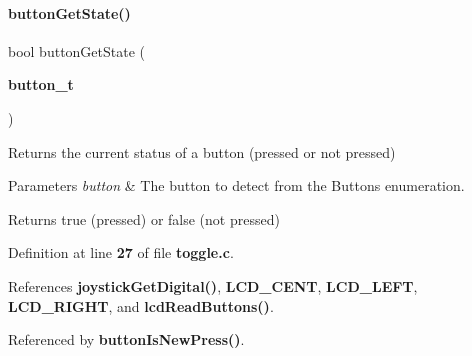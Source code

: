 \paragraph{button\+Get\+State()}
{\footnotesize\ttfamily bool button\+Get\+State (\begin{DoxyParamCaption}\item[{\textbf{ button\+\_\+t}}]{ }\end{DoxyParamCaption})}



Returns the current status of a button (pressed or not pressed) 


\begin{DoxyParams}{Parameters}
{\em button} & The button to detect from the Buttons enumeration.\\
\hline
\end{DoxyParams}
\begin{DoxyReturn}{Returns}
true (pressed) or false (not pressed) 
\end{DoxyReturn}


Definition at line \textbf{ 27} of file \textbf{ toggle.\+c}.



References \textbf{ joystick\+Get\+Digital()}, \textbf{ L\+C\+D\+\_\+\+C\+E\+NT}, \textbf{ L\+C\+D\+\_\+\+L\+E\+FT}, \textbf{ L\+C\+D\+\_\+\+R\+I\+G\+HT}, and \textbf{ lcd\+Read\+Buttons()}.



Referenced by \textbf{ button\+Is\+New\+Press()}.


